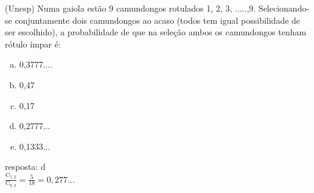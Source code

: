 \begin{ex}
	(Unesp) Numa gaiola estão 9 camundongos rotulados 1, 2, 3, .....,9. Selecionando-se conjuntamente dois camundongos ao acaso (todos tem igual possibilidade de ser escolhido), a probabilidade de que na seleção ambos os camundongos tenham rótulo ímpar é:
    \begin{enumerate}[(a)]
    \item 0,3777....
    \item 0,47
    \item 0,17
    \item 0,2777...
    \item 0,1333...
    \end{enumerate}
      \begin{sol}
        resposta: d \\
        $\frac{\mathrm{C}_{5,2}}{\mathrm{C}_{9,2}}=\frac{5}{18}=0,277...$
      \end{sol}
\end{ex}